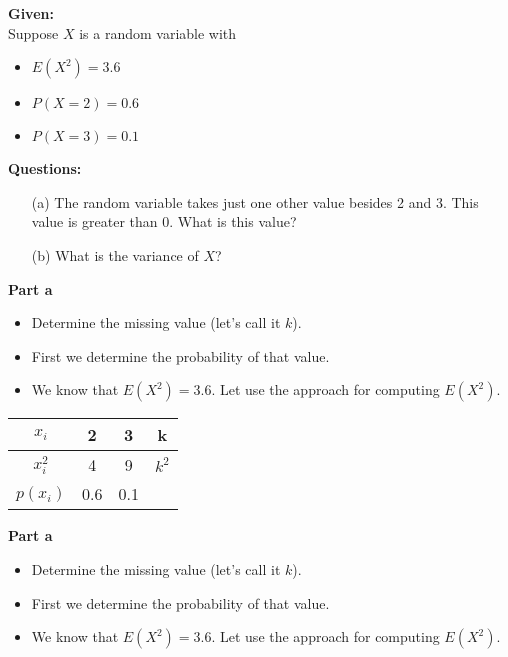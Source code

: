 \documentclass[]{report}
\begin{document}
	
	
	
	
	
	\vspace{-0.5cm}
	\textbf{Given:}\\
	Suppose $X$ is a random variable with 
	\begin{itemize}
		\item $E(X^2)=3.6$
		\item $P(X=2)=0.6$
		\item $P(X=3)=0.1$
	\end{itemize}
	
	
	\textbf{Questions:}
	\begin{itemize}
		\item[(a)] The random variable takes just one other value besides 2 and 3. This value is greater than 0. What is this value?\\
		\item[(b)] What is the variance of $X$?
	\end{itemize}
	
	
	
	
	
	\textbf{Part a}
	\begin{itemize}
		\item Determine the missing value (let's call it $k$).\\
		\item First we determine the probability of that value. 
		\item We know that $E(X^2)=3.6$. Let use the approach for computing $E(X^2)$.
		
	\end{itemize}
	
	\begin{center}
		\begin{tabular}{|c|c|c|c|}
			\hline
			$x_i$ & \phantom{sp}2\phantom{sp} & \phantom{sp}3\phantom{sp} & \phantom{sp}k\phantom{sp} \\ \hline
			$x^2_i$ & 4 & 9 & $k^2$ \\ \hline
			$p(x_i)$ & 0.6 &  0.1 &  \\ \hline 
		\end{tabular}
	\end{center}
	
	
	
	
	
	\textbf{Part a}
	\begin{itemize}
		\item Determine the missing value (let's call it $k$).\\
		\item First we determine the probability of that value. 
		\item We know that $E(X^2)=3.6$. Let use the approach for computing $E(X^2)$.
		
	\end{itemize}
	
\end{document}
